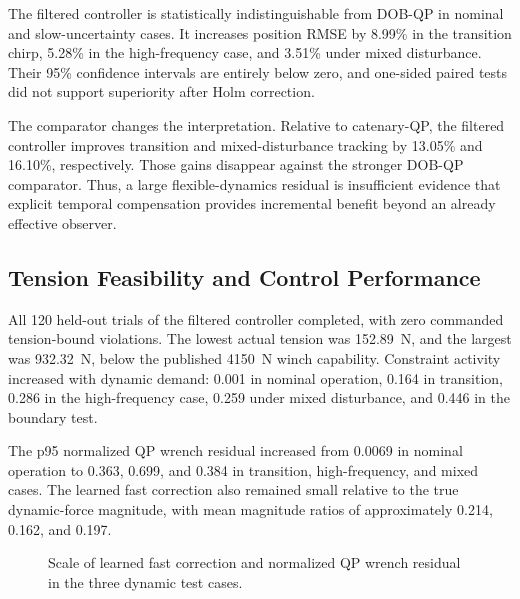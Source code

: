 \documentclass[conference]{IEEEtran}
\begin{document}
The filtered controller is statistically indistinguishable from DOB-QP in nominal and slow-uncertainty cases. It increases position RMSE by 8.99\% in the transition chirp, 5.28\% in the high-frequency case, and 3.51\% under mixed disturbance. Their 95\% confidence intervals are entirely below zero, and one-sided paired tests did not support superiority after Holm correction.

The comparator changes the interpretation. Relative to catenary-QP, the filtered controller improves transition and mixed-disturbance tracking by 13.05\% and 16.10\%, respectively. Those gains disappear against the stronger DOB-QP comparator. Thus, a large flexible-dynamics residual is insufficient evidence that explicit temporal compensation provides incremental benefit beyond an already effective observer.

\subsection{Tension Feasibility and Control Performance}
All 120 held-out trials of the filtered controller completed, with zero commanded tension-bound violations. The lowest actual tension was \SI{152.89}{N}, and the largest was \SI{932.32}{N}, below the published \SI{4150}{N} winch capability. Constraint activity increased with dynamic demand: 0.001 in nominal operation, 0.164 in transition, 0.286 in the high-frequency case, 0.259 under mixed disturbance, and 0.446 in the boundary test.

The p95 normalized QP wrench residual increased from 0.0069 in nominal operation to 0.363, 0.699, and 0.384 in transition, high-frequency, and mixed cases. The learned fast correction also remained small relative to the true dynamic-force magnitude, with mean magnitude ratios of approximately 0.214, 0.162, and 0.197.

\begin{figure}[t]
\centering
{}
\caption{Scale of learned fast correction and normalized QP wrench residual in the three dynamic test cases.}
\label{fig:feasibility}
\end{figure}
\end{document}
